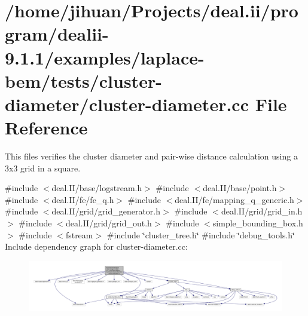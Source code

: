 \hypertarget{cluster-diameter_8cc}{}\section{/home/jihuan/\+Projects/deal.ii/program/dealii-\/9.1.1/examples/laplace-\/bem/tests/cluster-\/diameter/cluster-\/diameter.cc File Reference}
\label{cluster-diameter_8cc}


This files verifies the cluster diameter and pair-\/wise distance calculation using a 3x3 grid in a square.  


{\ttfamily \#include $<$deal.\+I\+I/base/logstream.\+h$>$}\newline
{\ttfamily \#include $<$deal.\+I\+I/base/point.\+h$>$}\newline
{\ttfamily \#include $<$deal.\+I\+I/fe/fe\+\_\+q.\+h$>$}\newline
{\ttfamily \#include $<$deal.\+I\+I/fe/mapping\+\_\+q\+\_\+generic.\+h$>$}\newline
{\ttfamily \#include $<$deal.\+I\+I/grid/grid\+\_\+generator.\+h$>$}\newline
{\ttfamily \#include $<$deal.\+I\+I/grid/grid\+\_\+in.\+h$>$}\newline
{\ttfamily \#include $<$deal.\+I\+I/grid/grid\+\_\+out.\+h$>$}\newline
{\ttfamily \#include $<$simple\+\_\+bounding\+\_\+box.\+h$>$}\newline
{\ttfamily \#include $<$fstream$>$}\newline
{\ttfamily \#include \char`\"{}cluster\+\_\+tree.\+h\char`\"{}}\newline
{\ttfamily \#include \char`\"{}debug\+\_\+tools.\+h\char`\"{}}\newline
Include dependency graph for cluster-\/diameter.cc\+:\nopagebreak
\begin{figure}[H]
\begin{center}
\leavevmode
\includegraphics[width=350pt]{cluster-diameter_8cc__incl}
\end{center}
\end{figure}
